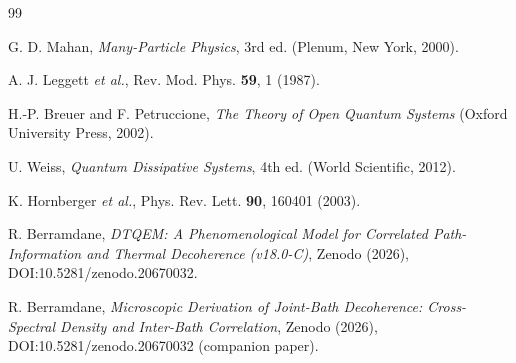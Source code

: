 \documentclass[aps,prl,twocolumn,showpacs,superscriptaddress,groupedaddress]{revtex4-2}
\begin{document}
\begin{thebibliography}{99}

G. D. Mahan,
\emph{Many-Particle Physics}, 3rd ed.
(Plenum, New York, 2000).

A. J. Leggett \emph{et al.},
Rev. Mod. Phys. \textbf{59}, 1 (1987).

H.-P. Breuer and F. Petruccione,
\emph{The Theory of Open Quantum Systems}
(Oxford University Press, 2002).

U. Weiss,
\emph{Quantum Dissipative Systems}, 4th ed.
(World Scientific, 2012).

K. Hornberger \emph{et al.},
Phys. Rev. Lett. \textbf{90}, 160401 (2003).

R. Berramdane,
\textit{DTQEM: A Phenomenological Model for Correlated Path-Information and Thermal Decoherence (v18.0-C)},
Zenodo (2026), DOI:10.5281/zenodo.20670032.

R. Berramdane,
\textit{Microscopic Derivation of Joint-Bath Decoherence: Cross-Spectral Density and Inter-Bath Correlation},
Zenodo (2026), DOI:10.5281/zenodo.20670032 (companion paper).

\end{thebibliography}
\end{document}
